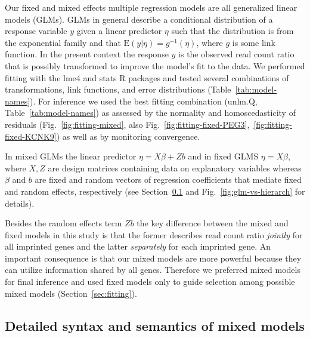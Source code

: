 \documentclass[letterpaper]{article}
\begin{document}
Our fixed and mixed effects multiple regression models are all generalized
linear models (GLMs).  GLMs in general describe a conditional distribution of
a response variable \(y\) given a linear predictor \(\eta\) such that the
distribution is from the exponential family and that \(\mathrm{E}(y|\eta) =
g^{-1} (\eta)\), where \(g\) is some link function.  In the present context
the response \(y\) is the observed read count ratio that is possibly
transformed to improve the model's fit to the data.  We performed fitting with
the lme4 and stats R packages and tested several combinations of
transformations, link functions, and error distributions
(Table~\ref{tab:model-names}).  For inference we used the best fitting
combination (\(\mathrm{unlm.Q}\), Table~\ref{tab:model-names}) as assessed by
the normality and homoscedasticity of residuals (Fig.~\ref{fig:fitting-mixed},
also Fig.~\ref{fig:fitting-fixed-PEG3},~\ref{fig:fitting-fixed-KCNK9}) as well
as by monitoring convergence.

In mixed GLMs the linear predictor \(\eta = X
\beta + Z b\) and in fixed GLMS \(\eta = X \beta\), where \(X, Z\) are design
matrices containing data on explanatory variables whereas \(\beta \) and \(b\)
are fixed and random vectors of regression coefficients that mediate fixed and
random effects, respectively (see Section~\ref{sec:mixed-mod} and
Fig.~\ref{fig:glm-vs-hierarch} for 
details).

Besides the random effects term \(Zb\) the key difference between
the mixed and fixed models in this study is that the former describes
read count ratio \emph{jointly} for all imprinted genes and the latter
\emph{separately} for each imprinted gene.  An important consequence is that
our mixed models are more powerful because they can utilize 
information shared by all genes.  Therefore we preferred mixed models for final
inference and used fixed models only to guide selection among possible mixed
models (Section~\ref{sec:fitting}).

\subsection{Detailed syntax and semantics of mixed models}
\label{sec:mixed-mod}
\end{document}

